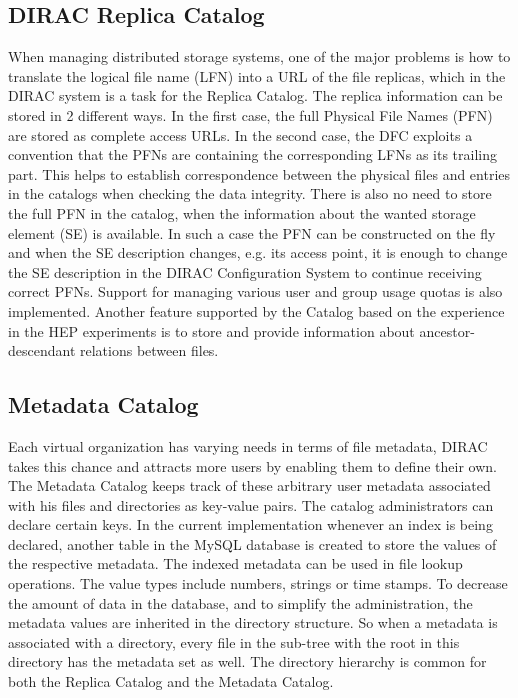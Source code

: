\subsection{DIRAC Replica Catalog}

When managing distributed storage systems, one of the major problems is how to translate the logical 
file name (LFN) into a URL of the file replicas, which in the DIRAC system is a task for the Replica
Catalog. The replica information can be stored in 2 different ways. In the first case, the full Physical File
Names (PFN) are stored as complete access URLs. In the second case, the DFC exploits a convention
that the PFNs are containing the corresponding LFNs as its trailing part. 
This helps to establish correspondence between the physical files and entries in the catalogs when checking 
the data integrity. There is also no need to store the full PFN in the catalog, when
the information about the wanted storage element (SE) is available. In such a case the PFN can be constructed on 
the fly and when the SE description changes, e.g. its access point, it is enough to change the SE description in the DIRAC 
Configuration System to continue receiving correct PFNs. Support for managing various user and group usage 
quotas is also implemented. Another feature supported by the Catalog based on the experience in 
the HEP experiments is to store and provide information about ancestor-descendant 
relations between files. 

\subsection{Metadata Catalog}

Each virtual organization has varying needs in terms of file metadata, DIRAC takes this chance and 
attracts more users by enabling them to define their own. The Metadata Catalog keeps track of these 
arbitrary user metadata associated with his files and directories as key-value pairs. 
The catalog administrators can declare certain keys. In the current implementation whenever an 
index is being declared, another table in the MySQL database is created to store the values of the 
respective metadata. The indexed metadata can be used in file lookup operations. The value types include 
numbers, strings or time stamps. To decrease the amount of data in the database, and to simplify the 
administration, the metadata values are inherited in the directory structure. So when a metadata is 
associated with a directory, every file in the sub-tree with the root in this directory has the metadata
set as well. The directory hierarchy is common for both the Replica Catalog and the Metadata Catalog.


